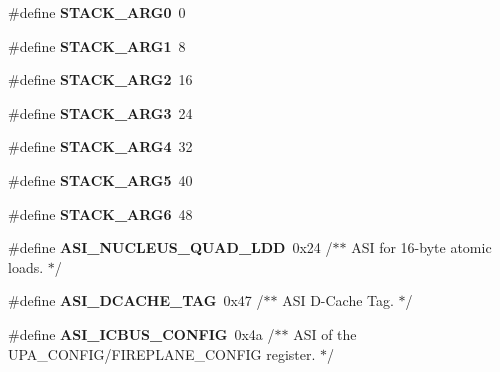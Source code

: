 \begin{DoxyCompactItemize}
\item 
\mbox{\label{group__RTEMSBSPsSPARC64_gac1948ad8a9983ef5650199af215d5132}} 
\#define {\bfseries S\+T\+A\+C\+K\+\_\+\+A\+R\+G0}~0
\item 
\mbox{\label{group__RTEMSBSPsSPARC64_gaf166453b1b149624b37d9466446118c8}} 
\#define {\bfseries S\+T\+A\+C\+K\+\_\+\+A\+R\+G1}~8
\item 
\mbox{\label{group__RTEMSBSPsSPARC64_ga863e429c4d707ab24d677ea1b7639485}} 
\#define {\bfseries S\+T\+A\+C\+K\+\_\+\+A\+R\+G2}~16
\item 
\mbox{\label{group__RTEMSBSPsSPARC64_ga0617092123fc78726b8ee511ab5163e1}} 
\#define {\bfseries S\+T\+A\+C\+K\+\_\+\+A\+R\+G3}~24
\item 
\mbox{\label{group__RTEMSBSPsSPARC64_ga9abe6fcb791db90c8fd6a4a11cdc7725}} 
\#define {\bfseries S\+T\+A\+C\+K\+\_\+\+A\+R\+G4}~32
\item 
\mbox{\label{group__RTEMSBSPsSPARC64_ga1fb3476f8bb595153849ff028e682a90}} 
\#define {\bfseries S\+T\+A\+C\+K\+\_\+\+A\+R\+G5}~40
\item 
\mbox{\label{group__RTEMSBSPsSPARC64_gae3a11595c54c8f0429306f514990fc0c}} 
\#define {\bfseries S\+T\+A\+C\+K\+\_\+\+A\+R\+G6}~48
\item 
\mbox{\label{group__RTEMSBSPsSPARC64_ga9b05632f6824f1ba95e4e5d31a986826}} 
\#define {\bfseries A\+S\+I\+\_\+\+N\+U\+C\+L\+E\+U\+S\+\_\+\+Q\+U\+A\+D\+\_\+\+L\+DD}~0x24	/$\ast$$\ast$ A\+S\+I for 16-\/byte atomic loads. $\ast$/
\item 
\mbox{\label{group__RTEMSBSPsSPARC64_ga68649a772bc177af36fc8224fc1972c0}} 
\#define {\bfseries A\+S\+I\+\_\+\+D\+C\+A\+C\+H\+E\+\_\+\+T\+AG}~0x47	/$\ast$$\ast$ A\+S\+I D-\/\+Cache Tag. $\ast$/
\item 
\mbox{\label{group__RTEMSBSPsSPARC64_ga013f28b088be058b46b2bccb3f57c1fe}} 
\#define {\bfseries A\+S\+I\+\_\+\+I\+C\+B\+U\+S\+\_\+\+C\+O\+N\+F\+IG}~0x4a	/$\ast$$\ast$ A\+S\+I of the U\+P\+A\+\_\+\+C\+O\+N\+F\+I\+G/\+F\+I\+R\+E\+P\+L\+A\+N\+E\+\_\+\+C\+O\+N\+F\+I\+G register. $\ast$/
\end{DoxyCompactItemize}
